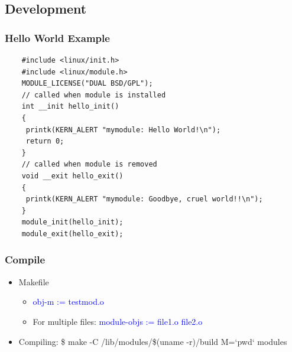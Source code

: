 \documentclass[12pt]{article}
\begin{document}
\subsection{Development}
\subsubsection{Hello World Example}
\begin{lstlisting}
    #include <linux/init.h> 
    #include <linux/module.h> 
    MODULE_LICENSE("DUAL BSD/GPL"); 
    // called when module is installed 
    int __init hello_init() 
    { 
     printk(KERN_ALERT "mymodule: Hello World!\n"); 
     return 0; 
    } 
    // called when module is removed 
    void __exit hello_exit() 
    { 
     printk(KERN_ALERT "mymodule: Goodbye, cruel world!!\n"); 
    } 
    module_init(hello_init); 
    module_exit(hello_exit);
\end{lstlisting}
\subsubsection{Compile}
\begin{itemize}
    \item Makefile \begin{itemize}
        \item \textcolor{blue}{obj-m := testmod.o}
        \item For multiple files: \textcolor{blue}{module-objs := file1.o file2.o}
    \end{itemize}
    \item Compiling: \$ make -C /lib/modules/\$(uname -r)/build M=`pwd` modules
\end{itemize}
\end{document}
